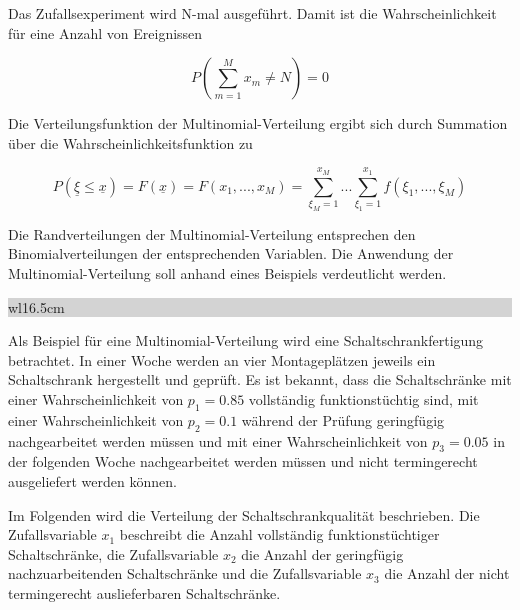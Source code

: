 \noindent Das Zufallsexperiment wird N-mal ausgef\"{u}hrt. Damit ist die Wahrscheinlichkeit f\"{u}r eine Anzahl von Ereignissen

\begin{equation}\label{eq:eightseventytwo}
P\left(\sum _{m=1}^{M}x_{m}  \ne N\right)=0
\end{equation}

\noindent Die Verteilungsfunktion der Multinomial-Verteilung ergibt sich durch Summation \"{u}ber die Wahrscheinlichkeitsfunktion zu

\begin{equation}\label{eq:eightseventythree}
P\left(\underline{\xi }\le \underline{x}\right)=F\left(\underline{x}\right)=F\left(x_{1} ,...,x_{M} \right)=\sum _{\xi _{M} =1}^{x_{M} }... \sum _{\xi _{1} =1}^{x_{1} }f\left(\xi _{1} ,...,\xi _{M} \right)
\end{equation}

\noindent Die Randverteilungen der Multinomial-Verteilung entsprechen den Binomialverteilungen der entsprechenden Variablen. Die Anwendung der Multinomial-Verteilung soll anhand eines Beispiels verdeutlicht werden.\bigskip

\noindent
\colorbox{lightgray}{%
%
\renewcommand\arraystretch{0.6}%
\begin{tabular}{ wl{16.5cm} }
{\selectfont
{}}
\end{tabular}%
}\medskip

\noindent Als Beispiel f\"{u}r eine Multinomial-Verteilung wird eine Schaltschrankfertigung betrachtet. In einer Woche werden an vier Montagepl\"{a}tzen jeweils ein Schaltschrank hergestellt und gepr\"{u}ft. Es ist bekannt, dass die Schaltschr\"{a}nke mit einer Wahrscheinlichkeit von $p_{1} = 0.85$ vollst\"{a}ndig funktionst\"{u}chtig sind, mit einer Wahrscheinlichkeit von $p_{2} = 0.1$ w\"{a}hrend der Pr\"{u}fung geringf\"{u}gig nachgearbeitet werden m\"{u}ssen und mit einer Wahrscheinlichkeit von $p_{3} = 0.05$ in der folgenden Woche nachgearbeitet werden m\"{u}ssen und nicht termingerecht ausgeliefert werden k\"{o}nnen.\newline

\noindent Im Folgenden wird die Verteilung der Schaltschrankqualit\"{a}t beschrieben. Die Zufallsvariable $x_{1}$ beschreibt die Anzahl vollst\"{a}ndig funktionst\"{u}chtiger Schaltschr\"{a}nke, die Zufallsvariable $x_{2}$ die Anzahl der geringf\"{u}gig nachzuarbeitenden Schaltschr\"{a}nke und die Zufallsvariable $x_{3}$ die Anzahl der nicht termingerecht auslieferbaren Schaltschr\"{a}nke.\newline 


